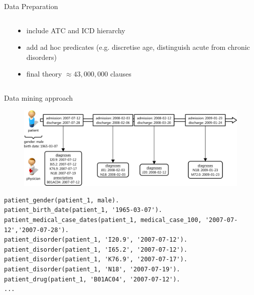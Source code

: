 \documentclass{beamer}
\begin{document}
\begin{frame}{Data Preparation}
\begin{columns}
\begin{column}{.3\textwidth}
\end{column}%
\hfill%
\begin{column}{.66\textwidth}
  \begin{itemize}
  \item include ATC and ICD hierarchy
  \item add ad hoc predicates (e.g. discretise age, distinguish acute from chronic disorders)
  \item final theory $\approx 43,000,000$ clauses
  \end{itemize}
\end{column}%
\end{columns}

\end{frame}

\begin{frame}[fragile]{Data mining approach}
 \begin{minipage}{\textwidth}
\begin{figure}
\includegraphics[width=\textwidth,keepaspectratio]{timeline_final2}
\end{figure}
  \end{minipage}
  \vfill
  \begin{minipage}{\textwidth}
    \centering
{\tiny
\begin{verbatim}
patient_gender(patient_1, male).
patient_birth_date(patient_1, '1965-03-07').
patient_medical_case_dates(patient_1, medical_case_100, '2007-07-12','2007-07-28').
patient_disorder(patient_1, 'I20.9', '2007-07-12').
patient_disorder(patient_1, 'I65.2', '2007-07-12').
patient_disorder(patient_1, 'K76.9', '2007-07-17').
patient_disorder(patient_1, 'N18', '2007-07-19').
patient_drug(patient_1, 'B01AC04', '2007-07-12').
...
\end{verbatim}
}
\end{minipage}
\end{frame}
\end{document}
